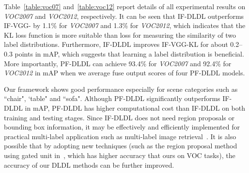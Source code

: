 \documentclass[journal]{IEEEtran}
\begin{document}
Table~\ref{table:voc07} and~\ref{table:voc12} report details of all experimental results on \emph{VOC2007} and \emph{VOC2012}, respectively. It can be seen that IF-DLDL outperforms IF-VGG- by 1.1\% for \emph{VOC2007} and 1.3\% for \emph{VOC2012}, which indicates that the KL loss function is more suitable than  loss for measuring the similarity of two label distributions. Furthermore, IF-DLDL improves IF-VGG-KL for about 0.2--0.3 points in mAP, which suggests that learning a label distribution is beneficial. More importantly, PF-DLDL can achieve 93.4\% for \emph{VOC2007} and 92.4\% for \emph{VOC2012} in mAP when we average fuse output scores of four PF-DLDL models.

Our framework shows good performance especially for scene categories such as ``chair", `table" and ``sofa". Although PF-DLDL significantly outperforms IF-DLDL in mAP, PF-DLDL has higher computational cost than IF-DLDL on both training and testing stages. Since IF-DLDL does not need region proposals or bounding box information, it may be effectively and efficiently implemented for practical multi-label application such as multi-label image retrieval~\cite{lai2016instance}. It is also possible that by adopting new techniques (such as the region proposal method using gated unit in~\cite{zhao2016regional}, which has higher accuracy that ours on VOC tasks), the accuracy of our DLDL methods can be further improved.
\end{document}
